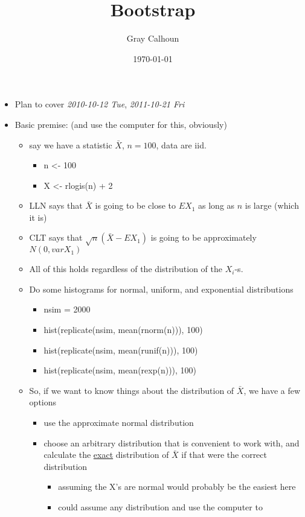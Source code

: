 \documentclass[11pt]{article}
\title{Bootstrap}
\author{Gray Calhoun}
\date{\today}
\begin{document}
\maketitle

\setcounter{tocdepth}{2}
\tableofcontents
\vspace*{1cm}
\begin{itemize}
\item Plan to cover \textit{2010-10-12 Tue}, \textit{2011-10-21 Fri}
\item Basic premise: (and use the computer for this, obviously)
\begin{itemize}
\item say we have a statistic $\bar X$, $n = 100$, data are iid.
\begin{itemize}
\item n <- 100
\item X <- rlogis(n) + 2
\end{itemize}
\item LLN says that $\bar X$ is going to be close to $E X_1$ as long
       as $n$ is large (which it is)
\item CLT says that $\sqrt{n} (\bar X - E X_1)$ is going to be
       approximately $N(0, var X_1)$
\item All of this holds regardless of the distribution of the
       $X_i$-s.
\item Do some histograms for normal, uniform, and exponential distributions
\begin{itemize}
\item nsim = 2000
\item hist(replicate(nsim, mean(rnorm(n))), 100)
\item hist(replicate(nsim, mean(runif(n))), 100)
\item hist(replicate(nsim, mean(rexp(n))), 100)
\end{itemize}
\item So, if we want to know things about the distribution of $\bar
       X$, we have a few options
\begin{itemize}
\item use the approximate normal distribution
\item choose an arbitrary distribution that is convenient to work
         with, and calculate the \underline{exact} distribution of $\bar X$ if
         that were the correct distribution
\begin{itemize}
\item assuming the X's are normal would probably be the easiest here
\item could assume any distribution and use the computer to

\end{itemize}
\end{itemize}
\end{itemize}
\end{itemize}
\end{document}
